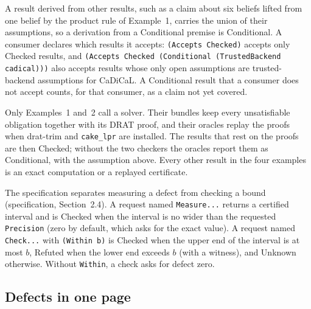 \documentclass[11pt]{article}
\newcommand{\code}[1]{\texttt{#1}}
\newcommand{\spec}[1]{specification, Section~#1}
\theoremstyle{definition}
\theoremstyle{plain}
\begin{document}
A result derived from other results, such as a claim about six beliefs lifted from one belief by the
product rule of Example~1, carries the union of their assumptions, so a derivation from a
Conditional premise is Conditional. A consumer declares which results it accepts:
\code{(Accepts Checked)} accepts only Checked results, and
\code{(Accepts Checked (Conditional (TrustedBackend cadical)))} also accepts results whose only open
assumptions are trusted-backend assumptions for CaDiCaL. A Conditional result that a consumer does
not accept counts, for that consumer, as a claim not yet covered.

Only Examples~1 and~2 call a solver. Their bundles keep every unsatisfiable obligation together with
its DRAT proof, and their oracles replay the proofs when drat-trim and \code{cake\_lpr} are
installed. The results that rest on the proofs are then Checked; without the two checkers the
oracles report them as Conditional, with the assumption above. Every other result in the four
examples is an exact computation or a replayed certificate.

The specification separates measuring a defect from checking a bound (\spec{2.4}). A request named
\code{Measure...} returns a certified interval and is Checked when the interval is no wider than the
requested \code{Precision} (zero by default, which asks for the exact value). A request named
\code{Check...} with \code{(Within b)} is Checked when the upper end of the interval is at most $b$,
Refuted when the lower end exceeds $b$ (with a witness), and Unknown otherwise. Without
\code{Within}, a check asks for defect zero.

\subsection{Defects in one page}\label{sec:defects}
\end{document}
